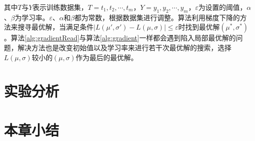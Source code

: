 其中$T$与$Y$表示训练数据集，$T={t_1,t_2,\cdots,t_m}$，$Y={y_1,y_2,\cdots,y_m}$，$\varepsilon$为设置的阈值，$\alpha$、$\beta$为学习率。$\varepsilon$、$\alpha$和$\beta$都为常数，根据数据集进行调整。算法利用梯度下降的方法来搜寻最优解，当满足条件$\vert L\left({\mu}',{\sigma}'\right) - L\left(\mu, \sigma \right)\vert \leq \varepsilon$时找到最优解$\left(\mu^{\ast},\sigma^{\ast}\right)$。算法\ref{alg:gradientRead}与算法\ref{alg:gradient}一样都会遇到陷入局部最优解的问题，解决方法也是改变初始值以及学习率来进行若干次最优解的搜索，选择$L\left(\mu, \sigma \right)$较小的$\left(\mu,\sigma\right)$作为最后的最优解。
\section{实验分析}
\label{sec5:experiment}

\section{本章小结}
\label{sec5:conclusion}